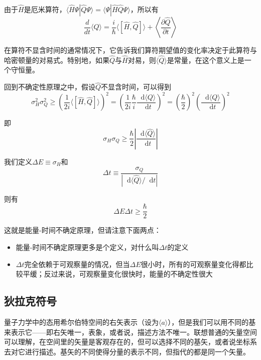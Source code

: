 \documentclass[UTF8]{ctexart}
\begin{document}
\noindent 由于$\hat{H}$是厄米算符，$\langle \hat{H} \Psi | \hat{Q} \Psi \rangle  = \langle \Psi | \hat{H} \hat{Q} \Psi \rangle $，所以有
\begin{equation}
    \frac{d}{d t}\langle Q\rangle=\frac{i}{\hbar}\langle[\hat{H}, \hat{Q}]\rangle+\left\langle\frac{\partial \hat{Q}}{\partial t}\right\rangle
    \end{equation}

\noindent 在算符不显含时间的通常情况下，它告诉我们算符期望值的变化率决定于此算符与哈密顿量的对易式。特别地，如果$\hat{Q}$与$\hat{H}$对易，则$\langle \hat{Q} \rangle $是常量，在这个意义上是一个守恒量。

    回到不确定性原理之中，假设$\hat{Q}$不显含时间，可以得到
    \begin{equation}
        \sigma_{H}^{2} \sigma_{Q}^{2} \geq\left(\frac{1}{2 i}\langle[\hat{H}, \hat{Q}]\rangle\right)^{2}=\left(\frac{1}{2 i} \frac{\hbar}{i} \frac{\mathop{}\!\mathrm{d} \langle Q\rangle}{\mathop{}\!\mathrm{d}  t}\right)^{2}=\left(\frac{\hbar}{2}\right)^{2}\left(\frac{\mathop{}\!\mathrm{d} \langle Q\rangle}{\mathop{}\!\mathrm{d}  t}\right)^{2}
        \end{equation}

\noindent 即
\begin{equation}
    \sigma_H \sigma_Q \ge \frac{\hbar}{2} \left| \frac{\mathop{}\!\mathrm{d} \langle \hat{Q} \rangle }{\mathop{}\!\mathrm{d} t}\right|
\end{equation}

    我们定义$\Delta E \equiv \sigma_H$和
    \begin{equation}
        \Delta t \equiv \frac{\sigma_Q}{|\mathop{}\!\mathrm{d} \langle \hat{Q} \rangle / \mathop{}\!\mathrm{d} t|}
    \end{equation}

\noindent 则有
\begin{equation}
    \Delta E \Delta t \ge \frac{\hbar}{2}
\end{equation}

\noindent 这就是能量-时间不确定原理，但请注意下面两点：
\begin{itemize}
    \item 能量-时间不确定原理更多是个定义，对什么叫$\Delta t$的定义
    \item $\Delta t$完全依赖于可观察量的情况，但当$\Delta E$很小时，所有的可观察量变化得都比较平缓；反过来说，可观察量变化很快时，能量的不确定性很大
\end{itemize}

    \subsection{狄拉克符号}
    量子力学中的态用希尔伯特空间的右矢表示（设为$\langle a \rangle$），但是我们可以用不同的基来表示它——即右矢唯一，表象，或者说，描述方法不唯一。联想普通的矢量空间可以理解，在空间里的矢量是客观存在的，但可以选择不同的基矢，或者说坐标系去对它进行描述。基矢的不同使得分量的表示不同，但指代的都是同一个矢量。
\end{document}

